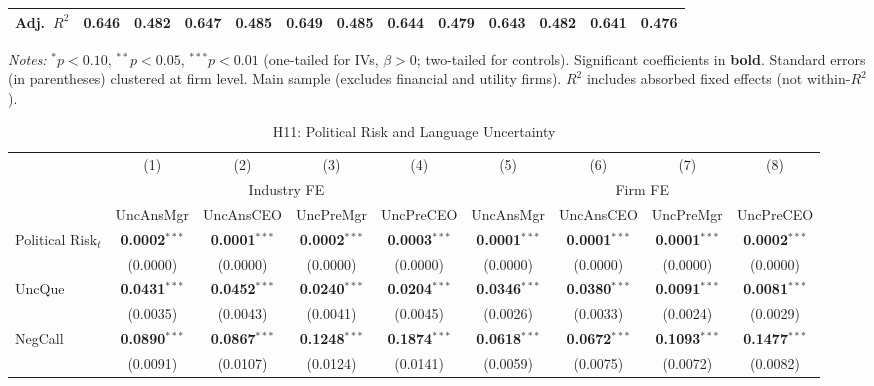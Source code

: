 \documentclass[11pt,a4paper]{article}
\begin{document}
\begin{table}[htbp]
\begin{tabular}{lcccccccccccc}
Adj.~$R^2$ & 0.646 & 0.482 & 0.647 & 0.485 & 0.649 & 0.485 & 0.644 & 0.479 & 0.643 & 0.482 & 0.641 & 0.476 \\
\bottomrule
\end{tabular}
\begin{minipage}{\linewidth}
\vspace{2pt}\scriptsize
\textit{Notes:} $^{*}p<0.10$, $^{**}p<0.05$, $^{***}p<0.01$ (one-tailed for IVs, $\beta > 0$; two-tailed for controls).
 Significant coefficients in \textbf{bold}.
 Standard errors (in parentheses) clustered at firm level.
 Main sample (excludes financial and utility firms).
 $R^2$ includes absorbed fixed effects (not within-$R^2$).
\end{minipage}
\end{table}
\clearpage
\begin{table}[htbp]
\centering
\caption{H11: Political Risk and Language Uncertainty}
\label{tab:h11_prisk_uncertainty}
\scriptsize
\begin{tabular}{lcccccccc}
\toprule
 & (1) & (2) & (3) & (4) & (5) & (6) & (7) & (8) \\
 & \multicolumn{4}{c}{Industry FE} & \multicolumn{4}{c}{Firm FE} \\
\cmidrule(lr){2-5} \cmidrule(lr){6-9}
 & UncAnsMgr & UncAnsCEO & UncPreMgr & UncPreCEO & UncAnsMgr & UncAnsCEO & UncPreMgr & UncPreCEO \\
\midrule
Political Risk$_{t}$ & \textbf{0.0002}$^{***}$ & \textbf{0.0001}$^{***}$ & \textbf{0.0002}$^{***}$ & \textbf{0.0003}$^{***}$ & \textbf{0.0001}$^{***}$ & \textbf{0.0001}$^{***}$ & \textbf{0.0001}$^{***}$ & \textbf{0.0002}$^{***}$ \\
 & (0.0000) & (0.0000) & (0.0000) & (0.0000) & (0.0000) & (0.0000) & (0.0000) & (0.0000) \\
\midrule
UncQue & \textbf{0.0431}$^{***}$ & \textbf{0.0452}$^{***}$ & \textbf{0.0240}$^{***}$ & \textbf{0.0204}$^{***}$ & \textbf{0.0346}$^{***}$ & \textbf{0.0380}$^{***}$ & \textbf{0.0091}$^{***}$ & \textbf{0.0081}$^{***}$ \\
 & (0.0035) & (0.0043) & (0.0041) & (0.0045) & (0.0026) & (0.0033) & (0.0024) & (0.0029) \\
NegCall & \textbf{0.0890}$^{***}$ & \textbf{0.0867}$^{***}$ & \textbf{0.1248}$^{***}$ & \textbf{0.1874}$^{***}$ & \textbf{0.0618}$^{***}$ & \textbf{0.0672}$^{***}$ & \textbf{0.1093}$^{***}$ & \textbf{0.1477}$^{***}$ \\
 & (0.0091) & (0.0107) & (0.0124) & (0.0141) & (0.0059) & (0.0075) & (0.0072) & (0.0082) \\

\end{tabular}
\end{table}
\end{document}
